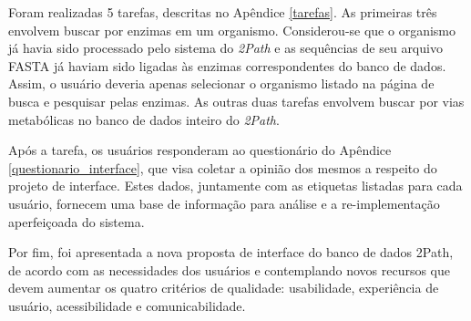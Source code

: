 \indent Foram realizadas 5 tarefas, descritas no Apêndice \ref{tarefas}. As primeiras três envolvem buscar por enzimas em um organismo. Considerou-se que o organismo já havia sido processado pelo sistema do \textit{2Path} e as sequências de seu arquivo FASTA já haviam sido ligadas às enzimas correspondentes do banco de dados. Assim, o usuário deveria apenas selecionar o organismo listado na página de busca e pesquisar pelas enzimas. As outras duas tarefas envolvem buscar por vias metabólicas no banco de dados inteiro do \textit{2Path}.

\indent Após a tarefa, os usuários responderam ao questionário do Apêndice \ref{questionario_interface}, que visa coletar a opinião dos mesmos a respeito do projeto de interface. Estes dados, juntamente com as etiquetas listadas para cada usuário, fornecem uma base de informação para análise e a re-implementação aperfeiçoada do sistema.

\indent Por fim, foi apresentada a nova proposta de interface do banco de dados 2Path, de acordo com as necessidades dos usuários e contemplando novos recursos que devem aumentar os quatro critérios de qualidade: usabilidade, experiência de usuário, acessibilidade e comunicabilidade.